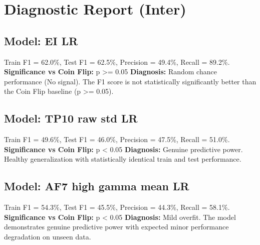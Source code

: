 \section*{Diagnostic Report (Inter)}
\subsection*{Model: EI LR}
Train F1 = 62.0\%, Test F1 = 62.5\%, Precision = 49.4\%, Recall = 89.2\%.
\newline
\textbf{Significance vs Coin Flip:} p >= 0.05
\newline
\textbf{Diagnosis:} Random chance performance (No signal). The F1 score is not statistically significantly better than the Coin Flip baseline (p >= 0.05).

\subsection*{Model: TP10 raw std LR}
Train F1 = 49.6\%, Test F1 = 46.0\%, Precision = 47.5\%, Recall = 51.0\%.
\newline
\textbf{Significance vs Coin Flip:} p < 0.05
\newline
\textbf{Diagnosis:} Genuine predictive power. Healthy generalization with statistically identical train and test performance.

\subsection*{Model: AF7 high gamma mean LR}
Train F1 = 54.3\%, Test F1 = 45.5\%, Precision = 44.3\%, Recall = 58.1\%.
\newline
\textbf{Significance vs Coin Flip:} p < 0.05
\newline
\textbf{Diagnosis:} Mild overfit. The model demonstrates genuine predictive power with expected minor performance degradation on unseen data.
